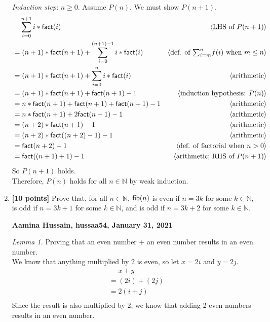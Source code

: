 \documentclass[11pt,fleqn]{article}
\newcommand{\mname}[1]{\mbox{\sf #1}}
\newcommand{\pnote}[1]{{\langle \text{#1} \rangle}}
\begin{document}
\begin{enumerate}
  \emph{Induction step}: $n \ge 0$. Assume $P(n)$. We must show $P(n + 1)$.
  \begin{align*}
    &\phantom{{}=} \sum_{i=0}^{n+1} i * \mname{fact}(i)   & \pnote{LHS of $P(n + 1)$}\\
    &=(n+1)*\mname{fact}(n+1)+\sum_{i=0}^{(n+1)-1} i * \mname{fact}(i)       & \pnote{def. of $\textstyle{\sum}_{i=m}^{n} f(i)$ when $m \le n$}\\
    &=(n+1)*\mname{fact}(n+1)+\sum_{i=0}^{n} i * \mname{fact}(i)  & \pnote{arithmetic}\\
    &=(n+1)*\mname{fact}(n+1)+\mname{fact}(n+1)-1 & \pnote{induction hypothesis: $P(n)$}\\
    &=n*\mname{fact}(n+1)+\mname{fact}(n+1)+\mname{fact}(n+1)-1   & \pnote{arithmetic}\\
    &=n*\mname{fact}(n+1)+2\mname{fact}(n+1)-1   & \pnote{arithmetic}\\
    &=(n+2)*\mname{fact}(n+1)-1   & \pnote{arithmetic}\\
    &=(n+2)*\mname{fact}((n+2)-1)-1   & \pnote{arithmetic}\\
    &=\mname{fact}(n+2)-1   & \pnote{def. of factorial when $n > 0$}\\
    &=\mname{fact}((n+1)+1)-1   & \pnote{arithmetic; RHS of $P(n + 1)$}
  \end{align*}
  So $P(n + 1)$ holds.\\
  Therefore, $P(n)$ holds for all $n \in \mathbb{N}$ by weak induction.

  \medskip

  \bigskip

  \item \textbf{[10 points]} Prove that, for all $n \in \mathbb{N}$,
    $\mname{fib}(n)$ is even if $n = 3k$ for some $k \in \mathbb{N}$,
    is odd if $n = 3k + 1$ for some $k \in \mathbb{N}$, and is odd if
    $n = 3k + 2$ for some $k \in \mathbb{N}$.

  \bigskip

  \textbf{Aamina Hussain, hussaa54, January 31, 2021}

  \emph{Lemma 1.} Proving that an even number $+$ an even number results in an even number.\\
  We know that anything multiplied by $2$ is even, so let $x=2i$ and $y=2j$.\\
  \begin{align*}
    &\phantom{{}=} x+y\\
    &= (2i)+(2j)\\
    &= 2(i+j)\\
  \end{align*}
  Since the result is also multiplied by 2, we know that adding 2 even numbers results in an even number.\\


\end{enumerate}
\end{document}
